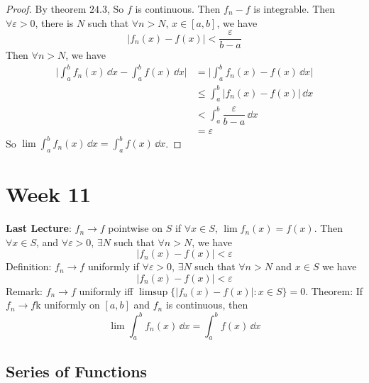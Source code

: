 \documentclass{report}
\begin{document}
\begin{proof}
    By theorem $24.3$, So $f$ is continuous. Then $f_{n} - f$ is integrable. Then $\forall \varepsilon> 0$, there is $N$ such that $\forall n> N$, $x \in [a, b]$, we have
        \begin{equation*}
            \lvert f_{n}(x) - f(x) \rvert < \dfrac{\varepsilon}{b - a}
        \end{equation*}
    Then $\forall n> N$, we have
        \begin{align*}
            \lvert \int_{a}^{b} f_{n}(x) \, \dd{x}  - \int_{a}^{b} f(x) \, \dd{x}  \rvert &= \lvert \int_{a}^{b} f_{n}(x) - f(x) \, \dd{x}  \rvert \\
                                                                                          &\leq \int_{a}^{b} \lvert f_{n}(x) - f(x) \rvert \, \dd{ x}  \\
                                                                                          &< \int_{a}^{b} \dfrac{\varepsilon}{ b - a} \, \dd{x}  \\
                                                                                          &= \varepsilon
        \end{align*}
    So $\lim \int_{a}^{b} f_{n}(x) \, \dd{x}  = \int_{a}^{b} f(x) \, \dd{x}$.
\end{proof}

\chapter{Week 11}

\textbf{Last Lecture}: $f_{n} \rightarrow f$ pointwise on $S$ if $\forall x \in S$, $\lim f_{n}(x) = f(x)$. Then $\forall  x\in S$, and $\forall \varepsilon> 0$, $\exists N$ such that $\forall n > N$, we have
    \begin{equation*}
        \lvert f_{n} (x) - f(x) \rvert < \varepsilon
    \end{equation*}
Definition: $f_{n} \rightarrow f$ uniformly if $\forall \varepsilon > 0$, $\exists N$ such that $\forall n > N$ and $x \in S$ we have
    \begin{equation*}
        \lvert f_{n}(x) - f(x) \rvert < \varepsilon
    \end{equation*}
Remark: $f_{n} \rightarrow f$ uniformly iff $\limsup \{\lvert f_{n}(x) - f(x) \rvert : x \in S\} = 0$. Theorem: If $f_{n} \rightarrow f$k uniformly on $[a, b]$ and $f_{n}$ is continuous, then 
    \begin{equation*}
        \lim \int_{a}^{b} f_{n}(x) \, \dd{x}  = \int_{a}^{b} f(x) \, \dd{x} 
    \end{equation*}
\begin{topic}
    \section{Series of Functions}
\end{topic}
\end{document}
